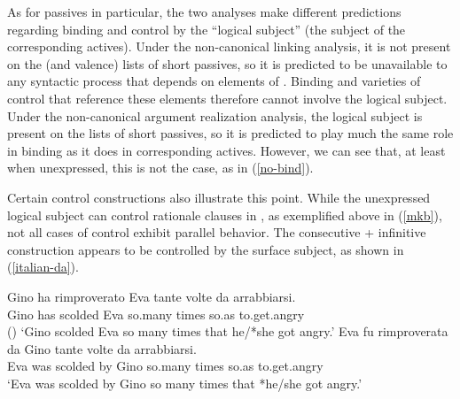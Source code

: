 \documentclass[output=paper
 	        ,biblatex
                ,babelshorthands
                ,newtxmath
                ,draftmode
                ,colorlinks, citecolor=brown
]{langscibook}
\begin{document}
As for passives in particular, the two analyses make different predictions regarding binding and control by the ``logical subject'' (the subject of the corresponding actives).
Under the non-canonical linking analysis, it is not present on the \argst (and valence) lists of short passives, so it is predicted to be unavailable to any syntactic process that depends on elements of \argst.
Binding and varieties of control that reference these elements therefore cannot involve the logical subject.
Under the non-canonical argument realization analysis, the logical subject is present on the \argst lists of short passives, so it is predicted to play much the same role in binding as it does in corresponding actives.
However, we can see that, at least when unexpressed, this is not the case, as in (\ref{no-bind}).
\begin{exe}
\end{exe}

Certain control constructions also illustrate this point.
While the unexpressed logical subject can control rationale clauses in , as exemplified above in (\ref{mkb}), not all cases of control exhibit parallel behavior.
The  consecutive  + infinitive construction \citep{Perlmutter1984, Sanfilippo1998} appears to be controlled by the surface subject, as shown in (\ref{italian-da}).


\begin{exe}
\ex     \label{italian-da}
\begin{xlist}
\ex
\gll Gino ha  rimproverato Eva tante   volte da    arrabbiarsi.  \\
     Gino has scolded      Eva so.many times so.as to.get.angry  \\\hfill()
\glt `Gino scolded Eva so many times that he/*she got angry.'
\ex
\gll Eva fu  rimproverata da Gino tante   volte da    arrabbiarsi.  \\
     Eva was scolded      by Gino so.many times so.as to.get.angry  \\
\glt `Eva was scolded by Gino so many times that *he/she got angry.'
\end{xlist}
\end{exe}
\end{document}
